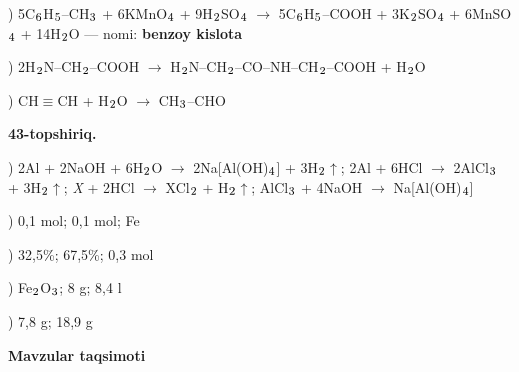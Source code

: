\documentclass[11pt,a4paper]{article}
\renewcommand{\textsubscript}[1]{\ensuremath{_{\text{\fontsize{8}{8}\selectfont #1}}}}
\begin{document}
) 5C\textsubscript{6}H\textsubscript{5}--CH\textsubscript{3} + 6KMnO\textsubscript{4} + 9H\textsubscript{2}SO\textsubscript{4} $\to$ 5C\textsubscript{6}H\textsubscript{5}--COOH + 3K\textsubscript{2}SO\textsubscript{4} + 6MnSO\textsubscript{4} + 14H\textsubscript{2}O --- nomi: \textbf{benzoy kislota}\par
{}) 2H\textsubscript{2}N--CH\textsubscript{2}--COOH $\to$ H\textsubscript{2}N--CH\textsubscript{2}--CO--NH--CH\textsubscript{2}--COOH + H\textsubscript{2}O\par
{}) CH$\equiv$CH + H\textsubscript{2}O $\to$ CH\textsubscript{3}--CHO\par
\noindent\textbf{43-topshiriq.}\par
{}) 2Al + 2NaOH + 6H\textsubscript{2}O $\to$ 2Na[Al(OH)\textsubscript{4}] + 3H\textsubscript{2}$\uparrow$; 2Al + 6HCl $\to$ 2AlCl\textsubscript{3} + 3H\textsubscript{2}$\uparrow$; \textit{X} + 2HCl $\to$ XCl\textsubscript{2} + H\textsubscript{2}$\uparrow$; AlCl\textsubscript{3} + 4NaOH $\to$ Na[Al(OH)\textsubscript{4}]\par
{}) 0,1 mol; 0,1 mol; Fe\par
{}) 32,5\%; 67,5\%; 0,3 mol\par
{}) Fe\textsubscript{2}O\textsubscript{3}; 8 g; 8,4 l\par
{}) 7,8 g; 18,9 g\par
\par\bigskip\noindent\textbf{Mavzular taqsimoti}\par\smallskip
\end{document}
